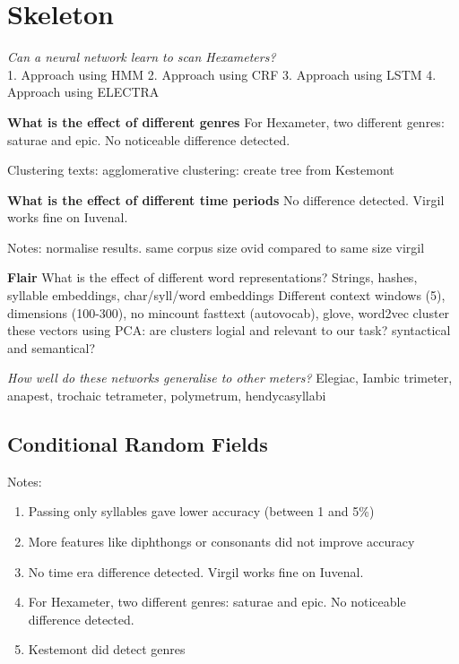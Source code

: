 \section{Skeleton}

\textit{Can a neural network learn to scan Hexameters?}\\

1. Approach using HMM
2. Approach using CRF
3. Approach using LSTM
4. Approach using ELECTRA

\textbf{What is the effect of different genres}
For Hexameter, two different genres: saturae and epic. No noticeable difference detected.

Clustering texts: agglomerative clustering: create tree from Kestemont


\textbf{What is the effect of different time periods}
No difference detected. Virgil works fine on Iuvenal.


Notes:
normalise results. same corpus size ovid compared to same size virgil

\textbf{Flair}
What is the effect of different word representations?
  Strings, hashes, syllable embeddings, char/syll/word embeddings
  Different context windows (5), dimensions (100-300), no mincount 
  fasttext (autovocab), glove, word2vec
    cluster these vectors using PCA: are clusters logial and relevant to our task? syntactical and semantical?

\textit{How well do these networks generalise to other meters?}
Elegiac, Iambic trimeter, anapest, trochaic tetrameter, polymetrum, hendycasyllabi

\newpage

\subsection{Conditional Random Fields}

Notes:
\begin{enumerate}
  \item Passing only syllables gave lower accuracy (between 1 and 5\%)
  \item More features like diphthongs or consonants did not improve accuracy
  \item No time era difference detected. Virgil works fine on Iuvenal.
  \item For Hexameter, two different genres: saturae and epic. No noticeable difference detected.
  \item Kestemont did detect genres
\end{enumerate}

